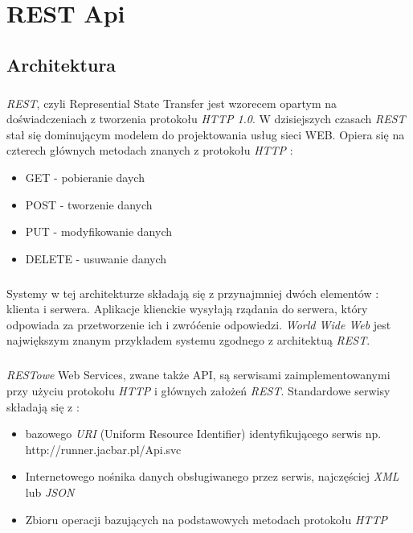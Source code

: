 \chapter{REST Api} %
\label{cha:rest_api}
\section{Architektura} %
\label{sec:architektura}
\paragraph{} %
\label{par:}
\textit{REST}, czyli Represential State Transfer jest wzorecem opartym na doświadczeniach z tworzenia protokołu \textit{HTTP 1.0}. W dzisiejszych czasach \textit{REST} stał się dominującym modelem do projektowania usług sieci WEB. Opiera się na czterech głównych metodach znanych z protokołu \textit{HTTP} : 

\begin{itemize}
	\item GET - pobieranie daych
	\item POST - tworzenie danych
	\item PUT - modyfikowanie danych
	\item DELETE - usuwanie danych
\end{itemize}

\paragraph{} %
\label{par:}
Systemy w tej architekturze składają się z przynajmniej dwóch elementów : klienta i serwera. Aplikacje klienckie wysyłają rządania do serwera, który odpowiada za przetworzenie ich i zwróćenie odpowiedzi.
\textit{World Wide Web} jest największym znanym przykładem systemu zgodnego z architektuą \textit{REST}.

\paragraph{} %
\label{par:}
\textit{RESTowe} Web Services, zwane także API, są serwisami zaimplementowanymi przy użyciu protokołu \textit{HTTP} i głównych założeń \textit{REST}. Standardowe serwisy składają się z :
\begin{itemize}
	\item bazowego \textit{URI} (Uniform Resource Identifier) identyfikującego serwis np. http://runner.jacbar.pl/Api.svc
	\item Internetowego nośnika danych obsługiwanego przez serwis, najczęściej \textit{XML} lub \textit{JSON}
	\item Zbioru operacji bazujących na podstawowych metodach protokołu \textit{HTTP}
\end{itemize}

